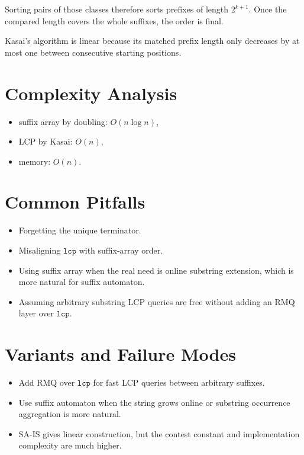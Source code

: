 Sorting pairs of those classes therefore sorts prefixes of length \(2^{k+1}\). Once the compared length covers the
whole suffixes, the order is final.

Kasai's algorithm is linear because its matched prefix length only decreases by at most one between consecutive starting
positions.

\section*{Complexity Analysis}

\begin{itemize}
  \item suffix array by doubling: \(O(n \log n)\),
  \item LCP by Kasai: \(O(n)\),
  \item memory: \(O(n)\).
\end{itemize}

\section*{Common Pitfalls}

\begin{itemize}
  \item Forgetting the unique terminator.
  \item Misaligning \(\texttt{lcp}\) with suffix-array order.
  \item Using suffix array when the real need is online substring extension, which is more natural for suffix automaton.
  \item Assuming arbitrary substring LCP queries are free without adding an RMQ layer over \(\texttt{lcp}\).
\end{itemize}

\section*{Variants and Failure Modes}

\begin{itemize}
  \item Add RMQ over \(\texttt{lcp}\) for fast LCP queries between arbitrary suffixes.
  \item Use suffix automaton when the string grows online or substring occurrence aggregation is more natural.
  \item SA-IS gives linear construction, but the contest constant and implementation complexity are much higher.
\end{itemize}

